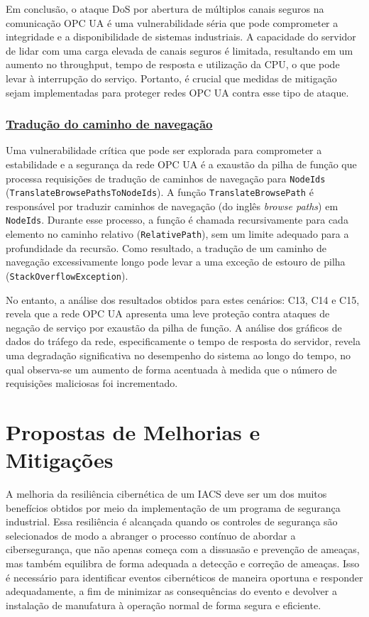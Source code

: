 Em conclusão, o ataque DoS por abertura de múltiplos canais seguros na comunicação OPC UA é uma vulnerabilidade séria que pode comprometer a integridade e a disponibilidade de sistemas industriais. A capacidade do servidor de lidar com uma carga elevada de canais seguros é limitada, resultando em um aumento no throughput, tempo de resposta e utilização da CPU, o que pode levar à interrupção do serviço. Portanto, é crucial que medidas de mitigação sejam implementadas para proteger redes OPC UA contra esse tipo de ataque.

\subsubsection*{\underline{Tradução do caminho de navegação}}

Uma vulnerabilidade crítica que pode ser explorada para comprometer a estabilidade e a segurança da rede OPC UA é a exaustão da pilha de função que processa requisições de tradução de caminhos de navegação para \texttt{NodeIds} (\texttt{TranslateBrowsePathsToNodeIds}). A função \texttt{TranslateBrowsePath} é responsável por traduzir caminhos de navegação (do inglês \textit{browse paths}) em \texttt{NodeIds}. Durante esse processo, a função é chamada recursivamente para cada elemento no caminho relativo (\texttt{RelativePath}), sem um limite adequado para a profundidade da recursão. Como resultado, a tradução de um caminho de navegação excessivamente longo pode levar a uma exceção de estouro de pilha (\texttt{StackOverflowException}).

No entanto, a análise dos resultados obtidos para estes cenários: C13, C14 e C15, revela que a rede OPC UA apresenta uma leve proteção contra ataques de negação de serviço por exaustão da pilha de função. A análise dos gráficos de dados do tráfego da rede, especificamente o tempo de resposta do servidor, revela uma degradação significativa no desempenho do sistema ao longo do tempo, no qual observa-se um aumento de forma acentuada à medida que o número de requisições maliciosas foi incrementado.

\section{Propostas de Melhorias e Mitigações} \label{sec:melhorias-mitigacoes}

A melhoria da resiliência cibernética de um IACS deve ser um dos muitos benefícios obtidos por meio da implementação de um programa de segurança industrial. Essa resiliência é alcançada quando os controles de segurança são selecionados de modo a abranger o processo contínuo de abordar a cibersegurança, que não apenas começa com a dissuasão e prevenção de ameaças, mas também equilibra de forma adequada a detecção e correção de ameaças. Isso é necessário para identificar eventos cibernéticos de maneira oportuna e responder adequadamente, a fim de minimizar as consequências do evento e devolver a instalação de manufatura à operação normal de forma segura e eficiente.

